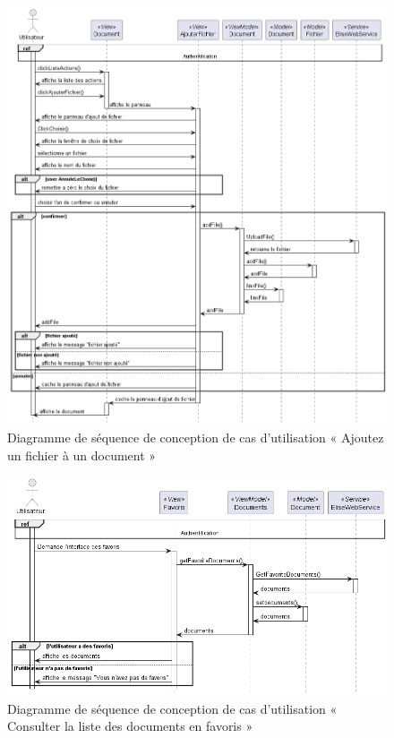 \begin{figure}[H]
  \centering
  \includegraphics[width=1\textwidth]{out/diagrams/documents/sequence_add_file/sequence_add_file}
  \caption{Diagramme de séquence de conception de cas d'utilisation « Ajoutez un fichier à un document »}
  \label{fig:sequence_conception_addFile}
\end{figure}
\begin{figure}[H]
  \centering
  \includegraphics[width=1\textwidth]{out/diagrams/documents/sequence_favoris/sequence_favoris}
  \caption{Diagramme de séquence de conception de cas d'utilisation « Consulter la liste des documents en favoris »}
  \label{fig:sequence_conception_favoritDocument}
\end{figure}
